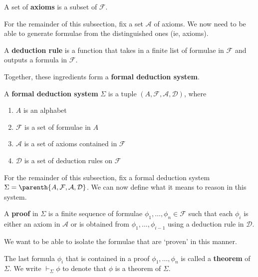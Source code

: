 \begin{boxdefinition}[Axioms]
    A set of \textbf{axioms} is a subset of $\mathcal{F}$.
\end{boxdefinition}

For the remainder of this subsection, fix a set $\mathcal{A}$ of axioms. We now need to be able to generate formulae from the distinguished ones (ie, axioms).

\begin{boxdefinition}
    A \textbf{deduction rule} is a function that takes in a finite list of formulae in $\mathcal{F}$ and outputs a formula in $\mathcal{F}$.
\end{boxdefinition}

Together, these ingredients form a \textbf{formal deduction system}.

\begin{boxdefinition}\label{Ch1:Def:Formal_Deduction_System}
    A \textbf{formal deduction system} $\Sigma$ is a tuple $(A, \mathcal{F}, \mathcal{A}, \mathcal{D})$, where
    \begin{enumerate}
        \item $A$ is an alphabet
        \item $\mathcal{F}$ is a set of formulae in $A$
        \item $\mathcal{A}$ is a set of axioms contained in $\mathcal{F}$
        \item $\mathcal{D}$ is a set of deduction rules on $\mathcal{F}$
    \end{enumerate}
\end{boxdefinition}

For the remainder of this subsection, fix a formal deduction system $\Sigma = \parenth{A, \mathcal{F}, \mathcal{A}, \mathcal{D}}$. We can now define what it means to reason in this system.

\begin{boxdefinition}[Proof]
    A \textbf{proof} in $\Sigma$ is a finite sequence of formulae $\phi_1, \ldots, \phi_n \in \mathcal{F}$ such that each $\phi_i$ is either an axiom in $\mathcal{A}$ or is obtained from $\phi_1, \ldots, \phi_{i-1}$ using a deduction rule in $\mathcal{D}$.
\end{boxdefinition}

We want to be able to isolate the formulae that are `proven' in this manner.

\begin{boxdefinition}[Theorem]\label{Ch1:Def:Thm}
    The last formula $\phi_i$ that is contained in a proof $\phi_1, \ldots, \phi_n$ is called a \textbf{theorem} of $\Sigma$. We write $\vdash_{\Sigma} \phi$ to denote that $\phi$ is a theorem of $\Sigma$.
\end{boxdefinition}

